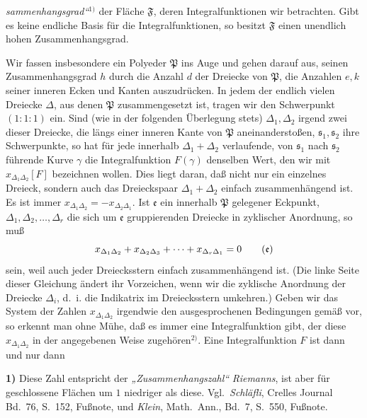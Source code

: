 \documentclass{article}
\begin{document}
\emph{sammenhangsgrad“}${}^{1)}$ der Fläche $\mathfrak{F}$, deren Integralfunktionen wir betrachten. Gibt es keine endliche Basis für die Integralfunktionen, so besitzt $\mathfrak{F}$ einen unendlich hohen Zusammenhangsgrad.

Wir fassen insbesondere ein Polyeder $\mathfrak{P}$ ins Auge und gehen darauf aus, seinen Zusammenhangsgrad $h$ durch die Anzahl $d$ der Dreiecke von $\mathfrak{P}$, die Anzahlen $e, k$ seiner inneren Ecken und Kanten auszudrücken. In jedem der endlich vielen Dreiecke $\Delta$, aus denen $\mathfrak{P}$ zusammengesetzt ist, tragen wir den Schwerpunkt $(1 : 1 : 1)$ ein. Sind (wie in der folgenden Überlegung stets) $\Delta_1, \Delta_2$ irgend zwei dieser Dreiecke, die längs einer inneren Kante von $\mathfrak{P}$ aneinanderstoßen, $\mathfrak{s}_1, \mathfrak{s}_2$ ihre Schwerpunkte, so hat für jede innerhalb $\Delta_1 + \Delta_2$ verlaufende, von $\mathfrak{s}_1$ nach $\mathfrak{s}_2$ führende Kurve $\gamma$ die Integralfunktion $F(\gamma)$ denselben Wert, den wir mit $x_{\Delta_1 \Delta_2} [F]$ bezeichnen wollen. Dies liegt daran, daß nicht nur ein einzelnes Dreieck, sondern auch das Dreieckspaar $\Delta_1 + \Delta_2$ einfach zusammenhängend ist. Es ist immer $x_{\Delta_1 \Delta_2} = - x_{\Delta_2 \Delta_1}$. Ist $\mathfrak{e}$ ein innerhalb $\mathfrak{P}$ gelegener Eckpunkt, $\Delta_1, \Delta_2, \dots, \Delta_r$ die sich um $\mathfrak{e}$ gruppierenden Dreiecke in zyklischer Anordnung, so muß
\[ x_{\Delta_1 \Delta_2} + x_{\Delta_2 \Delta_3} + \dots + x_{\Delta_r \Delta_1} = 0 \tag{$\mathfrak{e}$} \]
sein, weil auch jeder Dreiecksstern einfach zusammenhängend ist. (Die linke Seite dieser Gleichung ändert ihr Vorzeichen, wenn wir die zyklische Anordnung der Dreiecke $\Delta_i$, d.~i. die Indikatrix im Dreiecksstern umkehren.) Geben wir das System der Zahlen $x_{\Delta_1 \Delta_2}$ irgendwie den ausgesprochenen Bedingungen gemäß vor, so erkennt man ohne Mühe, daß es immer eine Integralfunktion gibt, der diese $x_{\Delta_1 \Delta_2}$ in der angegebenen Weise zugehören${}^{2)}$. Eine Integralfunktion $F$ ist dann und nur dann

\textbf{1)} Diese Zahl entspricht der \emph{„Zusammenhangszahl“} \emph{Riemanns}, ist aber für geschlossene Flächen um $1$ niedriger als diese. Vgl.\ \emph{Schläfli}, Crelles Journal Bd.\ 76, S.\ 152, Fußnote, und \emph{Klein}, Math.\ Ann., Bd.\ 7, S.\ 550, Fußnote.
\end{document}
